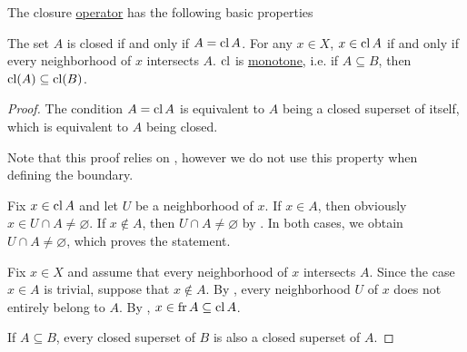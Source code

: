 \begin{proposition}\label{thm:closure_operator_properties}
  The closure \hyperref[def:closure_operator]{operator} has the following basic properties
  \begin{PropEnum}
     The set \( A \) is closed if and only if \( A = \operatorname{cl} A \).
     For any \( x \in X \), \( x \in \operatorname{cl} A \) if and only if every neighborhood of \( x \) intersects \( A \).
     \( \operatorname{cl} \) is \hyperref[def:monotone_map]{monotone}, i.e. if \( A \subseteq B \), then \( \operatorname{cl}(A) \subseteq \operatorname{cl}(B) \).
  \end{PropEnum}
\end{proposition}
\begin{proof}
   The condition \( A = \operatorname{cl}{A} \) is equivalent to \( A \) being a closed superset of itself, which is equivalent to \( A \) being closed.

   Note that this proof relies on , however we do not use this property when defining the boundary.

  \Sufficiency Fix \( x \in \operatorname{cl}{A} \) and let \( U \) be a neighborhood of \( x \). If \( x \in A \), then obviously \( x \in U \cap A \neq \varnothing \). If \( x \not\in A \), then \( U \cap A \neq \varnothing \) by . In both cases, we obtain \( U \cap A \neq \varnothing \), which proves the statement.

  \Necessity Fix \( x \in X \) and assume that every neighborhood of \( x \) intersects \( A \). Since the case \( x \in A \) is trivial, suppose that \( x \not\in A \). By , every neighborhood \( U \) of \( x \) does not entirely belong to \( A \). By , \( x \in \operatorname{fr} A \subseteq \operatorname{cl} A \).

   If \( A \subseteq B \), every closed superset of \( B \) is also a closed superset of \( A \).
\end{proof}

